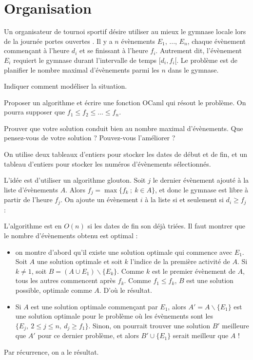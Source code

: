 \renewcommand{\SourceFile}{3-strategies-gloutonnes/src/3-6.ml}

\section{Organisation}

Un organisateur de tournoi sportif désire utiliser au mieux le gymnase locale lors de la journée \og portes ouvertes \fg{}. Il y a $n$ évènements $E_1$, ..., $E_n$, chaque évènement commençant à l'heure $d_i$ et se finissant à l'heure $f_i$. Autrement dit, l'évènement $E_i$ requiert le gymnase durant l'intervalle de temps $[d_i,f_i[$. Le problème est de planifier le nombre maximal d'évènements parmi les $n$ dans le gymnase.

\Q
Indiquer comment modéliser la situation.

\Q
Proposer un algorithme et écrire une fonction OCaml qui résout le problème. On pourra supposer que $f_1 \leq f_2 \leq ... \leq f_n$.

\Q
Prouver que votre solution conduit bien au nombre maximal d'évènements. Que pensez-vous de votre solution ? Pouvez-vous l'améliorer ?

\Corrige

\Q
On utilise deux tableaux d'entiers pour stocker les dates de début et de fin, et un tableau d'entiers pour stocker les numéros d'évènements sélectionnés.

\Q
L'idée est d'utiliser un algorithme glouton. Soit $j$ le dernier évènement ajouté à la liste d'évènements $A$. Alors $f_j=\max\{f_k\ ;\ k\in A\}$, et donc le gymnase est libre à partir de l'heure $f_j$. On ajoute un évènement $i$ à la liste si et seulement si $d_i \geq f_j$ :



\Q
L'algorithme est en $O(n)$ si les dates de fin son déjà triées. Il faut montrer que le nombre d'évènements obtenu est optimal :
\begin{itemize}
    \item on montre d'abord qu'il existe une solution optimale qui commence avec $E_1$. Soit $A$ une solution optimale et soit $k$ l'indice de la première activité de $A$. Si $k \neq 1$, soit $B=(A\cup E_1)\smallsetminus \{E_k\}$. Comme $k$ est le premier évènement de $A$, tous les autres commencent après $f_k$. Comme $f_1 \leq f_k$, $B$ est une solution possible, optimale comme $A$. D'où le résultat.
    \item Si $A$ est une solution optimale commençant par $E_1$, alors $A'=A\smallsetminus\{E_1\}$ est une solution optimale pour le problème où les évènements sont les $\{E_j,\ 2 \leq j \leq n,\ d_j \geq f_1\}$. Sinon, on pourrait trouver une solution $B'$ meilleure que $A'$ pour ce dernier problème, et alors $B'\cup \{E_1\}$ serait meilleur que $A$ !
\end{itemize}
Par récurrence, on a le résultat.
\medskip

